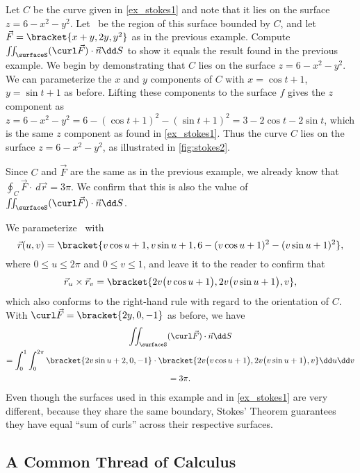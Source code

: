 \begin{example}\label{ex_stokes2}%
Let $C$ be the curve given in \autoref{ex_stokes1} and note that it lies on the surface $z = 6-x^2-y^2$. Let \surfaceS\ be the region of this surface bounded by $C$, and let $\vec F =\bracket{x+y,2y,y^2}$ as in the previous example. Compute $\iint_{\surfaceS} (\curl\vec F)\cdot \vec n\dd S $ to show it equals the result found in the previous example.
\solution
We begin by demonstrating that $C$ lies on the surface $z=6-x^2-y^2$. We can parameterize the $x$ and $y$ components of $C$ with $x=\cos t+1$, $y=\sin t+1$ as before. Lifting these components to the surface $f$ gives the $z$ component as $z = 6-x^2-y^2 = 6-(\cos t+1)^2-(\sin t+1)^2 = 3-2\cos t-2\sin t$, which is the same $z$ component as found in \autoref{ex_stokes1}. Thus the curve $C$ lies on the surface $z=6-x^2-y^2$, as illustrated in \autoref{fig:stokes2}. 

Since $C$ and $\vec F$ are the same as in the previous example, we already know that $\oint_C\vec F\cdot\ d\vec r = 3\pi$. We confirm that this is also the value of $\iint_{\surfaceS} (\curl\vec F)\cdot \vec n\dd S$.

We parameterize \surfaceS\ with
\[\vec r(u,v) =\bracket{v\cos u+1,v\sin u+1, 6-(v\cos u+1)^2-(v\sin u+1)^2},\]
where $0\leq u\leq 2\pi$ and $0\leq v\leq 1$, and leave it to the reader to confirm that
\[
\vec r_u\times \vec r_v =\bracket{2v\bigl(v\cos u+1\bigr), 2v\bigl(v\sin u+1\bigr),v},
\]
which also conforms to the right-hand rule with regard to the orientation of $C$. With $\curl \vec F =\bracket{2y,0,-1}$ as before, we have
\begin{multline*}
	\iint_{\surfaceS} (\curl\vec F)\cdot \vec n\dd S\\ 
	=\int_0^1\int_0^{2\pi}\bracket{2v\sin u+2,0,-1}\cdot\bracket{2v\bigl(v\cos u+1\bigr), 2v\bigl(v\sin u+1\bigr),v}\dd u\dd v\\
	=3\pi.
\end{multline*}
Even though the  surfaces used in this example and in \autoref{ex_stokes1} are very different, because they share the same boundary, Stokes' Theorem guarantees they have equal ``sum of curls'' across their respective surfaces.
\end{example}

\subsection{A Common Thread of Calculus}

